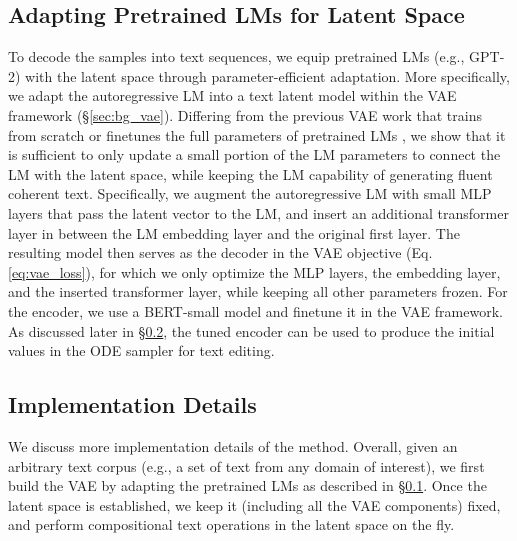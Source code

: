 \documentclass[11pt]{article}
\begin{document}
\subsection{Adapting Pretrained LMs for Latent Space}
\label{sec:vae_training}
To decode the  samples into text sequences, we equip pretrained LMs (e.g., GPT-2) with the latent space through parameter-efficient adaptation. More specifically, we adapt the autoregressive LM into a text latent model within the VAE framework (\S\ref{sec:bg_vae}). Differing from the previous VAE work that trains from scratch or finetunes the full parameters of pretrained LMs \citep{li-etal-2020-optimus,hu2021causal,hu2017toward}, we show that it is sufficient to only update a small portion of the LM parameters to connect the LM with the latent space, while keeping the LM capability of generating fluent coherent text. Specifically, we 
augment the autoregressive LM with small MLP layers that pass the latent vector  to the LM, and insert an additional transformer layer in between the LM embedding layer and the original first layer. The resulting model then serves as the decoder in the VAE objective (Eq.\ref{eq:vae_loss}), for which we only optimize the MLP layers, the embedding layer, and the inserted transformer layer, while keeping all other parameters frozen. For the encoder, we use a BERT-small model \cite{bert,DBLP:journals/corr/abs-1908-08962} and finetune it in the VAE framework. As discussed later in \S\ref{sec:implement}, the tuned encoder can be used to produce the initial  values in the ODE sampler for text editing.








\subsection{Implementation Details}\label{sec:implement}

We discuss more implementation details of the method. Overall, given an arbitrary text corpus (e.g., a set of text from any domain of interest), we first build the VAE by adapting the pretrained LMs as described in \S\ref{sec:vae_training}. Once the latent space is established, we keep it (including all the VAE components) fixed, and perform compositional text operations in the latent space on the fly.
\end{document}
